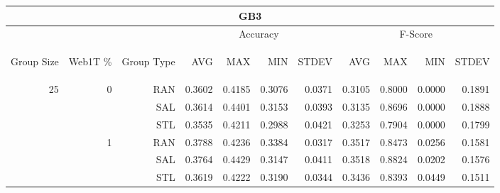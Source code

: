 \begin{center}
\begin{table}[htbp]
\begin{tabular}{ | r | r | r | r | r | r | r | r | r | r | r |}
\hline
\multicolumn{11}{|c|}{GB3}\\
\hline
 & & & \multicolumn{4}{|c|}{Accuracy} & \multicolumn{4}{|c|}{F-Score}\\ \cline{4-11}
\begin{sideways}Group Size\end{sideways} & \begin{sideways}Web1T \%\end{sideways} & \begin{sideways}Group Type\end{sideways} & \begin{sideways}AVG\end{sideways} & \begin{sideways}MAX\end{sideways} & \begin{sideways}MIN\end{sideways} & \begin{sideways}STDEV\end{sideways} & \begin{sideways}AVG\end{sideways} & \begin{sideways}MAX\end{sideways} & \begin{sideways}MIN\end{sideways} & \begin{sideways}STDEV\end{sideways}\\
\hline
\multirow{18}{*}{25}
 & \multirow{3}{*}{0} & RAN & 0.3602 & 0.4185 & 0.3076 & 0.0371 & 0.3105 & 0.8000 & 0.0000 & 0.1891\\ \cline{3-11}
 &   & SAL & 0.3614 & 0.4401 & 0.3153 & 0.0393 & 0.3135 & 0.8696 & 0.0000 & 0.1888\\ \cline{3-11}
 &   & STL & 0.3535 & 0.4211 & 0.2988 & 0.0421 & 0.3253 & 0.7904 & 0.0000 & 0.1799\\ \cline{2-11}
 & \multirow{3}{*}{1} & RAN & 0.3788 & 0.4236 & 0.3384 & 0.0317 & 0.3517 & 0.8473 & 0.0256 & 0.1581\\ \cline{3-11}
 &   & SAL & 0.3764 & 0.4429 & 0.3147 & 0.0411 & 0.3518 & 0.8824 & 0.0202 & 0.1576\\ \cline{3-11}
 &   & STL & 0.3619 & 0.4222 & 0.3190 & 0.0344 & 0.3436 & 0.8393 & 0.0449 & 0.1511\\ \cline{2-11}

\end{tabular}
\end{table}
\end{center}
